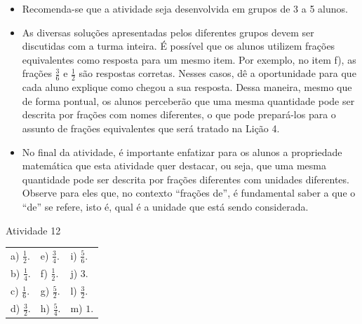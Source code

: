 \begin{multicols}{2}
  \vspace{.1cm}


  \vspace{.1cm}

  \begin{itemize} %
    \item       Recomenda-se que a atividade seja desenvolvida em grupos de 3 a 5 alunos.
    \item       As diversas soluções apresentadas pelos diferentes grupos devem ser discutidas com a turma inteira. É possível que os alunos utilizem frações equivalentes como resposta para um mesmo item. Por exemplo, no item f), as frações       $\frac{3}{6}$ e       $\frac{1}{2}$ são respostas corretas. Nesses casos, dê a oportunidade para que cada aluno explique como chegou a sua resposta. Dessa maneira, mesmo que de forma pontual, os alunos perceberão que uma mesma quantidade pode ser descrita por frações com nomes diferentes, o que pode prepará-los para o assunto de frações equivalentes que será tratado na Lição 4.
    \item       No final da atividade, é importante enfatizar para os alunos a propriedade matemática que esta atividade quer destacar, ou seja, que uma mesma quantidade pode ser descrita por frações diferentes com unidades diferentes. Observe para eles que, no contexto ``frações de'', é fundamental saber a que o       ``de''     se refere, isto é, qual é a unidade que está sendo considerada.
\end{itemize} %


  \vspace{.1cm}


\newpage
\begin{resposta*}{Atividade 12}
  
\begin{tabular}{m{}m{}m{}}
    a) $\frac{1}{2}$. & e) $\frac{3}{4}$. &  i) $\frac{5}{6}$.\\
    b) $\frac{1}{4}$. & f) $\frac{1}{2}$. &  j) $3$.\\
    c) $\frac{1}{6}$. & g) $\frac{5}{2}$. &  l) $\frac{3}{2}$.\\
    d) $\frac{3}{2}$. & h) $\frac{5}{4}$. &  m) $1$.
\end{tabular} %


\end{resposta*}
\end{multicols}
